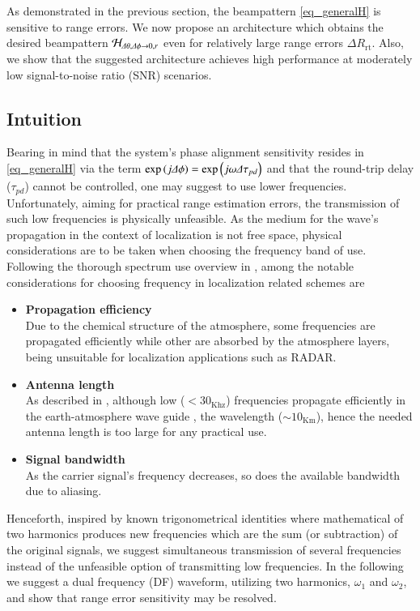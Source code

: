 As demonstrated in the previous section, the beampattern \eqref{eq_generalH} is sensitive to range errors.
We now propose an architecture which obtains the desired beampattern $\mathcal{H}_{\Delta\theta,\Delta\phi\to0,r}$ even for relatively large range errors $\Delta R_{\text{rt}}$. Also, we show that the suggested architecture achieves high performance at moderately low signal-to-noise ratio (SNR) scenarios.

\subsection{Intuition}
Bearing in mind that the system's phase alignment sensitivity resides in \eqref{eq_generalH} via the  term $\exp\left({j\Delta\phi}\right)=\exp\left({j\omega\Delta\tau_{pd}}\right)$ and that the round-trip delay ($\tau_{pd}$) cannot be controlled, one may suggest to use lower frequencies. 
Unfortunately, aiming for practical range estimation errors, the transmission of such low frequencies is physically unfeasible.
As the medium for the wave's propagation in the context of localization is not free space, physical considerations are to be taken when choosing the frequency band of use.
Following the thorough spectrum use overview in \cite{barclay2003propagation}, among the notable considerations for choosing frequency in localization related schemes are
\begin{itemize}
    \item \textbf{Propagation efficiency}\\
    Due to the chemical structure of the atmosphere, some frequencies are propagated efficiently while other are absorbed \cite{wen2015foundations} by the atmosphere layers, being unsuitable for localization applications such as RADAR.
    \item \textbf{Antenna length}\\
    As described in \cite{barclay2003propagation}, although low ($<30_{\text{Khz}}$) frequencies propagate efficiently in the earth-atmosphere wave guide \cite{wen2015foundations}, the wavelength ($\sim10_{\text{Km}}$), hence the needed antenna length is too large for any practical use.
    \item \textbf{Signal bandwidth}\\
    As the carrier signal's frequency decreases, so does the available bandwidth due to aliasing.
\end{itemize}
Henceforth, inspired by known trigonometrical identities where mathematical of two harmonics produces new frequencies which are the sum (or subtraction) of the original signals, we suggest simultaneous transmission of several frequencies instead of the unfeasible option of transmitting low frequencies. 
In the following we suggest a dual frequency (DF) waveform, utilizing two harmonics, $\omega_1$ and $\omega_2$, and show that range error sensitivity may be resolved.

